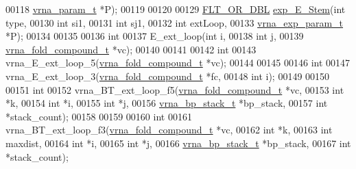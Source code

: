 \begin{DoxyCode}
00118            \hyperlink{group__energy__parameters_structvrna__param__s}{vrna\_param\_t} *P);
00119 
00120 
00129 \hyperlink{group__data__structures_ga31125aeace516926bf7f251f759b6126}{FLT\_OR\_DBL} \hyperlink{group__loops_gab0aa9833ab41875a91a9be8a5ffd7092}{exp\_E\_Stem}(\textcolor{keywordtype}{int}               type,
00130                       \textcolor{keywordtype}{int}               si1,
00131                       \textcolor{keywordtype}{int}               sj1,
00132                       \textcolor{keywordtype}{int}               extLoop,
00133                       \hyperlink{group__energy__parameters_structvrna__exp__param__s}{vrna\_exp\_param\_t}  *P);
00134 
00135 
00136 \textcolor{keywordtype}{int}
00137 E\_ext\_loop(\textcolor{keywordtype}{int}                  i,
00138            \textcolor{keywordtype}{int}                  j,
00139            \hyperlink{group__fold__compound_structvrna__fc__s}{vrna\_fold\_compound\_t} *vc);
00140 
00141 
00142 \textcolor{keywordtype}{int}
00143 vrna\_E\_ext\_loop\_5(\hyperlink{group__fold__compound_structvrna__fc__s}{vrna\_fold\_compound\_t} *vc);
00144 
00145 
00146 \textcolor{keywordtype}{int}
00147 vrna\_E\_ext\_loop\_3(\hyperlink{group__fold__compound_structvrna__fc__s}{vrna\_fold\_compound\_t}  *fc,
00148                   \textcolor{keywordtype}{int}                   i);
00149 
00150 
00151 \textcolor{keywordtype}{int}
00152 vrna\_BT\_ext\_loop\_f5(\hyperlink{group__fold__compound_structvrna__fc__s}{vrna\_fold\_compound\_t}  *vc,
00153                     \textcolor{keywordtype}{int}                   *k,
00154                     \textcolor{keywordtype}{int}                   *i,
00155                     \textcolor{keywordtype}{int}                   *j,
00156                     \hyperlink{group__data__structures_structvrna__bp__stack__s}{vrna\_bp\_stack\_t}       *bp\_stack,
00157                     \textcolor{keywordtype}{int}                   *stack\_count);
00158 
00159 
00160 \textcolor{keywordtype}{int}
00161 vrna\_BT\_ext\_loop\_f3(\hyperlink{group__fold__compound_structvrna__fc__s}{vrna\_fold\_compound\_t}  *vc,
00162                     \textcolor{keywordtype}{int}                   *k,
00163                     \textcolor{keywordtype}{int}                   maxdist,
00164                     \textcolor{keywordtype}{int}                   *i,
00165                     \textcolor{keywordtype}{int}                   *j,
00166                     \hyperlink{group__data__structures_structvrna__bp__stack__s}{vrna\_bp\_stack\_t}       *bp\_stack,
00167                     \textcolor{keywordtype}{int}                   *stack\_count);

\end{DoxyCode}
